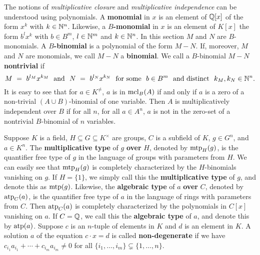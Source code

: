 \begin{comment}


\begin{proof}
Suppose \(A\) is \(C\)-generic over \(B\). Choose $A'$ to be a multiplicative basis of \(A\) over \(B\).
%
So $A'$ is multiplicatively independent over \(B\), and therefore also algebraically independent over $B\cup C$ by \(C\)-genericity.
%
Conversely, suppose the later condition holds.
%
Clearly, $A'$ is $C$-generic over $B$, and \( \mcl_B(A) = \mcl_B(A')  \). We apply (4) of the preceding proposition to get  the desired conclusion.
\end{proof}
\end{comment}

%
\noindent The notions of {\it multiplicative closure} and {\it multiplicative independence} can be understood using polynomials. A {\bf monomial} in $x$ is an element of $\mathbb{Q}[x]$ of the form  $x^k$ with $k \in \mathbb{N}^n$. Likewise, a {\bf $B$-monomial} in $x$ is an element of $K[x]$ the form $b^l x^k$ with $b\in B^m$, $l \in \mathbb{N}^m$ and $k \in \mathbb{N}^n$. In this section $M$ and $N$ are $B$-monomials. 
%
A {\bf $B$-binomial} is a polynomial of the form $M-N$. If, moreover, $M$ and $N$ are monomials, we call $M-N$ a {\bf binomial}.
%
We call a $B$-binomial $M-N$ {\bf nontrivial}  if 
$$M\ =\ b^{l_M}x^{k_M}\ \text{ and }\ N\ =\ b^{l_N}x^{k_N}\ \text{ for some }\ b \in B^m\ \text{ and distinct }\ k_M, k_N \in \nn^n.$$ 
%
It is easy to see that for $a \in K^\neq$, $a$ is in $\mathrm{mcl}_B(A)$ if and only if $a$ is a zero of a non-trivial $(A \cup B)$-binomial of one variable. 
%
Then $A$ is multiplicatively independent over $B$ if for all $n$, for all $a \in A^n$, $a$ is not in the zero-set of a nontrivial $B$-binomial of $n$ variables.




Suppose $K$ is a field, $H \subseteq G \subseteq K^\times $ are groups, $C$ is a subfield of $K$, $g \in G^n$, and $a \in K^n$.
%
The  \textbf{multiplicative type} of $g$ \textbf{over} \(H\), denoted by \( \mathrm{mtp}_H(g)\), is the quantifier free type of \(g\) in the language of groups with parameters from \(H\).
%
We can easily see that \( \mathrm{mtp}_H(g)\) is completely characterized by the $H$-binomials vanishing on \(g\). 
%
If \(H=\{1\}\), we simply call this the  \textbf{multiplicative type} of $g$, and denote this as \( \mathrm{mtp}(g)\).
%
Likewise, the  \textbf{algebraic type} of $a$ \textbf{over} \(C\), denoted by \( \mathrm{atp}_C(a)\), is the quantifier free type of \(a\) in the language of rings with parameters from \(C\).
%
Then \( \mathrm{atp}_C(a)\) is completely characterized by the polynomials in $C[x]$ vanishing on \(a\).
%
If \(C=\mathbb{Q}\), we call this the  \textbf{algebraic type} of $a$, and denote this by \( \mathrm{atp}(a)\). Suppose \( c\) is an $n$-tuple of elements in \( K\) and $d$ is an element in $K$. 
%
A solution \(a\) of the equation \(c\cdot x =d \) is called {\bf non-degenerate} if we have \(c_{i_1}a_{i_1}+\cdots+c_{i_m}a_{i_m} \neq 0 \) for all \( \{i_1, \ldots, i_m  \} \subsetneq
 \{1, \ldots, n\} \).


